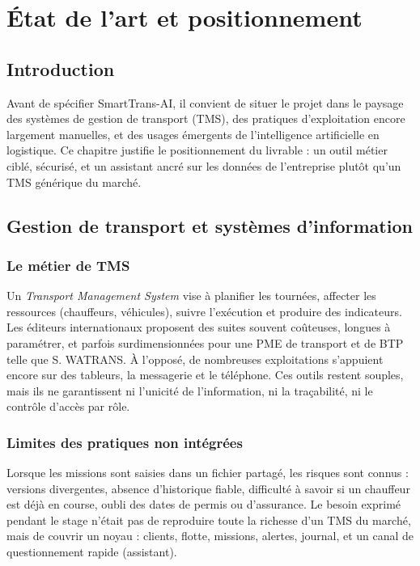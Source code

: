 \chapter{État de l'art et positionnement}

\section{Introduction}

Avant de spécifier SmartTrans-AI, il convient de situer le projet dans le paysage des systèmes de gestion de transport (TMS), des pratiques d'exploitation encore largement manuelles, et des usages émergents de l'intelligence artificielle en logistique. Ce chapitre justifie le positionnement du livrable : un outil métier ciblé, sécurisé, et un assistant ancré sur les données de l'entreprise plutôt qu'un TMS générique du marché.

\section{Gestion de transport et systèmes d'information}

\subsection{Le métier de TMS}

Un \textit{Transport Management System} vise à planifier les tournées, affecter les ressources (chauffeurs, véhicules), suivre l'exécution et produire des indicateurs. Les éditeurs internationaux proposent des suites souvent coûteuses, longues à paramétrer, et parfois surdimensionnées pour une PME de transport et de BTP telle que S. WATRANS. À l'opposé, de nombreuses exploitations s'appuient encore sur des tableurs, la messagerie et le téléphone. Ces outils restent souples, mais ils ne garantissent ni l'unicité de l'information, ni la traçabilité, ni le contrôle d'accès par rôle.

\subsection{Limites des pratiques non intégrées}

Lorsque les missions sont saisies dans un fichier partagé, les risques sont connus : versions divergentes, absence d'historique fiable, difficulté à savoir si un chauffeur est déjà en course, oubli des dates de permis ou d'assurance. Le besoin exprimé pendant le stage n'était pas de reproduire toute la richesse d'un TMS du marché, mais de couvrir un noyau : clients, flotte, missions, alertes, journal, et un canal de questionnement rapide (assistant).

